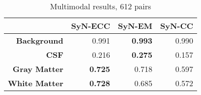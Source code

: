 \begin{table}[htbp]
  \centering
  {\small
    \begin{tabular}{rrrr}
    \toprule
          & \textbf{SyN-ECC} & \textbf{SyN-EM} & \textbf{SyN-CC} \\
    \midrule
    \textbf{Background} & 0.991 & \textbf{0.993} & 0.990 \\
    \textbf{CSF} & 0.216 & \textbf{0.275} & 0.157 \\
    \textbf{Gray Matter} & \textbf{0.725} & 0.718 & 0.597 \\
    \textbf{White Matter} & \textbf{0.728} & 0.685 & 0.572 \\
    \bottomrule
    \end{tabular}}%
  \caption{Multimodal results, 612 pairs}
  \label{tab:addlabel}%
\end{table}%
